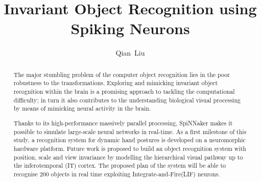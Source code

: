 \documentclass[journal]{journal}
\begin{document}
\title{Invariant Object Recognition using Spiking Neurons}
\author{
Qian~Liu
}%

\maketitle
\thispagestyle{empty}

\begin{abstract}
The major stumbling problem of the computer object recognition lies in the poor robustness to the transformations.
Exploring and mimicking invariant object recognition within the brain is a promising approach to tackling the computational difficulty;
in turn it also contributes to the understanding biological visual processing by means of mimicking neural activity in the brain.

Thanks to its high-performance massively parallel processing, SpiNNaker makes it possible to simulate large-scale neural networks in real-time.
As a first milestone of this study, a recognition system for dynamic hand postures is developed on a neuromorphic hardware platform. Future work is proposed to build an object recognition system with position, scale and view invariance by modelling the hierarchical visual pathway up to the inferotemporal (IT) cortex.
The proposed plan of the system will be able to recognise 200 objects in real time exploiting Integrate-and-Fire(LIF) neurons.
\end{abstract}

\end{document}

